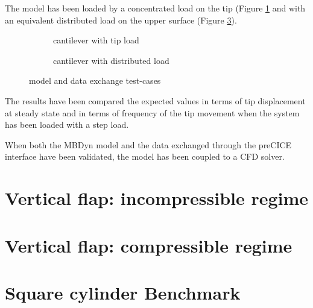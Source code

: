 The model has been loaded by a concentrated load on the tip (Figure \ref{fig:cnt-tip} and with an equivalent distributed load on the upper surface (Figure \ref{fig:cnt-distrib}).

\begin{figure}[htbp!]
	    \begin{subfigure}{.8\textwidth}
	    \centering
    	\caption{cantilever with tip load}
		\label{fig:cnt-tip}
	    \end{subfigure}
	    \par\bigskip
	    \begin{subfigure}{.8\textwidth}
		\centering
    	\caption{cantilever with distributed load}
		\label{fig:cnt-distrib}
	    \end{subfigure}
	\caption{model and data exchange test-cases}
\end{figure}

The results have been compared the expected values in terms of tip displacement at steady state and in terms of frequency of the tip movement when the system has been loaded with a step load.

When both the MBDyn model and the data exchanged through the preCICE interface have been validated, the model has been coupled to a CFD solver.

\section{Vertical flap: incompressible regime}

\section{Vertical flap: compressible regime}


\section{Square cylinder Benchmark}


